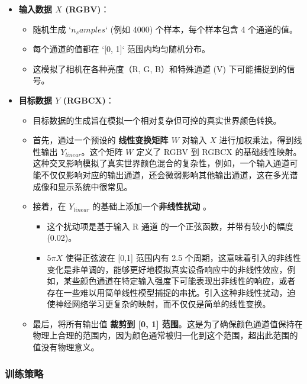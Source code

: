 \begin{itemize}
    \item \textbf{输入数据 $X$ (RGBV)}：
        \begin{itemize}
            \item 随机生成 `$n_samples$` (例如 4000) 个样本，每个样本包含 4 个通道的值。
            \item 每个通道的值都在 `[0, 1]` 范围内均匀随机分布。
            \item 这模拟了相机在各种亮度（R, G, B）和特殊通道 (V) 下可能捕捉到的信号。
        \end{itemize}
    \item \textbf{目标数据 $Y$ (RGBCX)}：
        \begin{itemize}
            \item 目标数据的生成旨在模拟一个相对复杂但可控的真实世界颜色转换。
            \item 首先，通过一个预设的 \textbf{线性变换矩阵 $W$} 对输入 $X$ 进行加权乘法，得到线性输出 $Y_{linear}$。这个矩阵 $W$ 定义了 RGBV 到 RGBCX 的基础线性映射。
                这种交叉影响模拟了真实世界颜色混合的复杂性，例如，一个输入通道可能不仅仅影响对应的输出通道，还会微弱影响其他输出通道，这在多光谱成像和显示系统中很常见。
            \item 接着，在 $Y_{linear}$ 的基础上添加一个\textbf{非线性扰动} 。
                \begin{itemize}
                    \item 这个扰动项是基于输入 R 通道 的一个正弦函数，并带有较小的幅度 (0.02)。
                    \item $5 \pi X$ 使得正弦波在 [0,1] 范围内有 2.5 个周期，这意味着引入的非线性变化是非单调的，能够更好地模拟真实设备响应中的非线性效应，例如，某些颜色通道在特定输入强度下可能表现出非线性的响应，或者存在一些难以用简单线性模型捕捉的串扰。引入这种非线性扰动，迫使神经网络学习更复杂的映射，而不仅仅是简单的线性变换。
                \end{itemize}
            \item 最后，将所有输出值 \textbf{裁剪到 [0, 1] 范围}。这是为了确保颜色通道值保持在物理上合理的范围内，因为颜色通常被归一化到这个范围，超出此范围的值没有物理意义。
        \end{itemize}
\end{itemize}

\subsubsection[\hspace{-2pt}训练策略]{{\heiti{} \hspace{-8pt}训练策略}}\label{section2: 训练策略}

